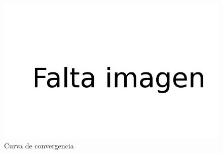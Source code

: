\begin{figure}[h]
\centering
\includegraphics[scale=0.3]{images/FALTA.png}
\caption{Curva de convergencia}
\label{fig:convergencia}
\end{figure}

